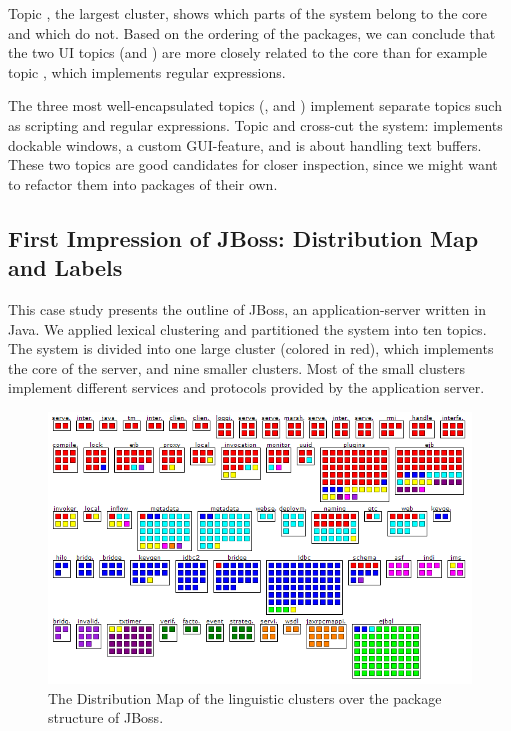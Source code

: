 Topic \red, the largest cluster, shows which parts of the system belong to the core and which do not. Based on the ordering of the packages, we can conclude that the two UI topics (\green and \yellow) are more closely related to the core than for example topic \cyan, which implements regular expressions.

The three most well-encapsulated topics (\eg \orange, \blue and \cyan) implement separate topics such as scripting and regular expressions. Topic \yellow and \pink cross-cut the system: \yellow implements dockable windows, a custom GUI-feature, and \pink is about handling text buffers. These two topics are good candidates for closer inspection, since we might want to refactor them into packages of their own.

\subsection{First Impression of JBoss: Distribution Map and Labels}\label{sec:azureus}

This case study presents the outline of JBoss, an application-server written in Java. We applied lexical clustering and partitioned the system into ten topics. The system is divided into one large cluster (colored in red), which implements the core of the server, and nine smaller clusters. Most of the small clusters implement different services and protocols provided by the application server.

\begin{figure}[htbp]
\begin{center}
  \includegraphics[width=\linewidth]{fig/hapax-jboss-distribution}
  \caption{The Distribution Map of the linguistic clusters over the package structure of JBoss.}
  \label{fig:JBossDistribution}
\end{center}
\end{figure}


